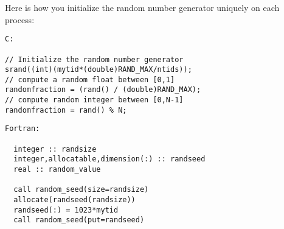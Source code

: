 
Here is how you initialize the random number generator uniquely on each process:

{\footnotesize
\begin{verbatim}
C:

// Initialize the random number generator
srand((int)(mytid*(double)RAND_MAX/ntids));
// compute a random float between [0,1]
randomfraction = (rand() / (double)RAND_MAX);
// compute random integer between [0,N-1]
randomfraction = rand() % N;
\end{verbatim}
\begin{verbatim}
Fortran:

  integer :: randsize
  integer,allocatable,dimension(:) :: randseed
  real :: random_value

  call random_seed(size=randsize)
  allocate(randseed(randsize))
  randseed(:) = 1023*mytid
  call random_seed(put=randseed)
\end{verbatim}
}

